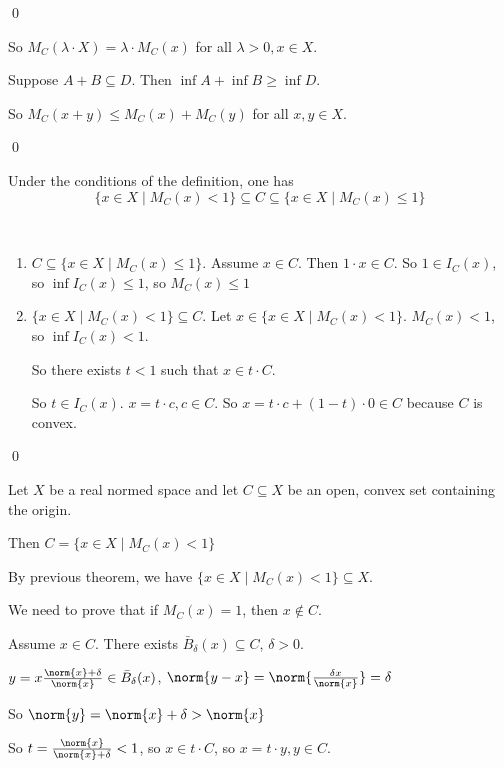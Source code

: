 \documentclass[x11names,reqno,14pt]{extarticle}
\begin{document}
\qed

So $M_C(\lambda\cdot X) = \lambda \cdot M_C(x)$ for all $\lambda > 0, x \in X$. 

Suppose $A + B \subseteq D$. Then $\inf A + \inf B \geq \inf D$. 

So $M_C(x + y) \leq M_C(x) + M_C(y)$ for all $x, y \in X$. 

\qed

\thm Under the conditions of the definition, one has
\[
\{x\in X \mid M_C(x)<1 \} \subseteq C \subseteq \{x\in X \mid M_C(x)\leq 1\}
\]

\proof\,

\begin{enumerate}

\item $C \subseteq \{x\in X \mid M_C(x)\leq 1\}$. Assume $x \in C$. Then $1\cdot x \in C$. So $1 \in I_C(x)$, so $\inf I_C(x)\leq 1$, so $M_C(x)\leq 1$

\item $\{x\in X \mid M_C(x) < 1\}\subseteq C$. Let $x \in \{x\in X \mid M_C(x)<1\}$. $M_C(x)<1$, so $\inf I_C(x) < 1$. 

So there exists $t<1$ such that $x \in t\cdot C$. 

So $t \in I_C(x)$. $x = t\cdot c, c \in C$. So $x = t\cdot c + (1 - t)\cdot 0 \in C$ because $C$ is convex. 

\end{enumerate}

\qed

\thm

Let $X$ be a real normed space and let $C \subseteq X$ be an open, convex set containing the origin. 

Then $C = \{x \in X \mid M_C(x) < 1\}$

\proof

By previous theorem, we have $\{x \in X \mid M_C(x)<1\}\subseteq X$.

We need to prove that if $M_C(x) = 1$, then $x\not\in C$.

Assume $x \in C$. There exists $\bar{B}_\delta(x)\subseteq C$, $\delta>0$.

$y = x\frac{\norm{x} + \delta}{\norm{x}} \in \bar{B}_\delta(x)$, $\norm{y - x} = \norm{\frac{\delta x}{\norm{x}}} = \delta$

So $\norm{y} = \norm{x} + \delta > \norm{x}$

So $t = \frac{\norm{x}}{\norm{x} + \delta} < 1$, so $x \in t \cdot C$, so $x = t\cdot y, y \in C$. 
\end{document}
